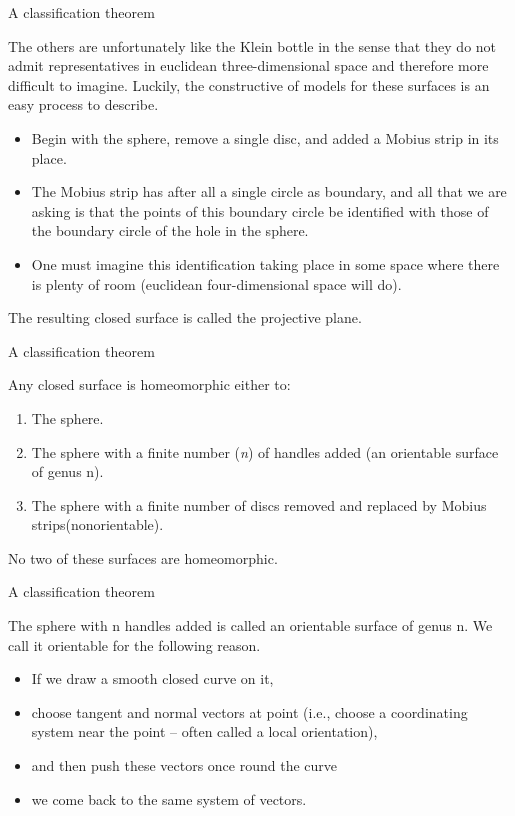 \documentclass{beamer}
\begin{document}
\begin{frame}{A classification theorem}
  \begin{block}{}
    The others are unfortunately like the Klein bottle in the sense that they do not admit representatives in euclidean three-dimensional space and therefore more difficult to imagine. Luckily, the constructive of models for these surfaces is an easy process to describe.
    \begin{itemize}
    \item Begin with the sphere, remove a single disc, and added a Mobius strip in its place.
    \item The Mobius strip has after all a single circle as boundary, and all that we are asking is that the points of this boundary circle be identified with those of the boundary circle of the hole in the sphere.
    \item One must imagine this identification taking place in some space where there is plenty of room (euclidean four-dimensional space will do).
    \end{itemize}
  \end{block}
  The resulting closed surface is called the projective plane.
\end{frame}

\begin{frame}{A classification theorem}
  \begin{theorem}
    Any closed surface is homeomorphic either to:
    \begin{enumerate}[label={(\alph*)}]
    \item The sphere.
    \item The sphere with a finite number (\textsl{n}) of handles added (an orientable surface of genus n).
    \item The sphere with a finite number of discs removed and replaced by Mobius strips(nonorientable).
    \end{enumerate}
    No two of these surfaces are homeomorphic.
  \end{theorem}
\end{frame}

\begin{frame}{A classification theorem}
  \begin{block}{}
    The sphere with n handles added is called an orientable surface of genus n. We call it orientable for the following reason.
    \begin{itemize}
    \item If we draw a smooth closed curve on it,
    \item choose tangent and normal vectors at point (i.e., choose a coordinating system near the point -- often called a local orientation),
    \item and then push these vectors once round the curve
    \item we come back to the same system of vectors.
    \end{itemize}
  \end{block}
\end{frame}
\end{document}
